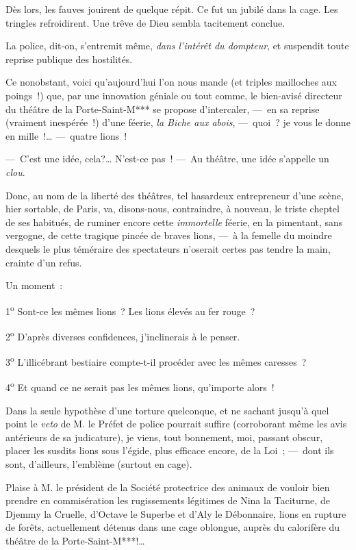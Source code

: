 \documentclass[french,twoside]{book} %
\begin{document}
Dès lors, les fauves jouirent de quelque répit. Ce fut un jubilé dans la cage. Les tringles refroidirent. Une trêve de Dieu sembla tacitement conclue.\par
La police, dit-on, s’entremit même, \emph{dans l’intérêt du dompteur}, et suspendit toute reprise publique des hostilités.\par
Ce nonobstant, voici qu’aujourd’hui l’on nous   mande (et triples mailloches aux poings !) que, par une innovation géniale ou tout comme, le bien-avisé directeur du théâtre de la Porte-Saint-M*** se propose d’intercaler, — en sa reprise (vraiment inespérée !) d’une féerie, \emph{la Biche aux abois}, — quoi ? je vous le donne en mille !… — quatre lions !\par
— C’est une idée, cela?… N’est-ce pas ! — Au théâtre, une idée s’appelle un \emph{clou}.\par
Donc, au nom de la liberté des théâtres, tel hasardeux entrepreneur d’une scène, hier sortable, de Paris, va, disons-nous, contraindre, à nouveau, le triste cheptel de ses habitués, de ruminer encore cette \emph{immortelle} féerie, en la pimentant, sans vergogne, de cette tragique pincée de braves lions, — à la femelle du moindre desquels le plus téméraire des spectateurs n’oserait certes pas tendre la main, crainte d’un refus.\par
Un moment :\par
1\textsuperscript{o} Sont-ce les mêmes lions ? Les lions élevés au fer rouge ?\par
2\textsuperscript{o} D’après diverses confidences, j’inclinerais à le penser.\par
   3\textsuperscript{o} L’illicébrant bestiaire compte-t-il procéder avec les mêmes caresses ?\par
4\textsuperscript{o} Et quand ce ne serait pas les mêmes lions, qu’importe alors !\par
Dans la seule hypothèse d’une torture quelconque, et ne sachant jusqu’à quel point le \emph{veto} de M. le Préfet de police pourrait suffire (corroborant même les avis antérieurs de sa judicature), je viens, tout bonnement, moi, passant obscur, placer les susdits lions sous l’égide, plus efficace encore, de la Loi ; — dont ils sont, d’ailleurs, l’emblème (surtout en cage).\par
Plaise à M. le président de la Société protectrice des animaux de vouloir bien prendre en commisération les rugissements légitimes de Nina la Taciturne, de Djemmy la Cruelle, d’Octave le Superbe et d’Aly le Débonnaire, lions en rupture de forêts, actuellement détenus dans une cage oblongue, auprès du calorifère du théâtre de la Porte-Saint-M***!…\par
\end{document}
